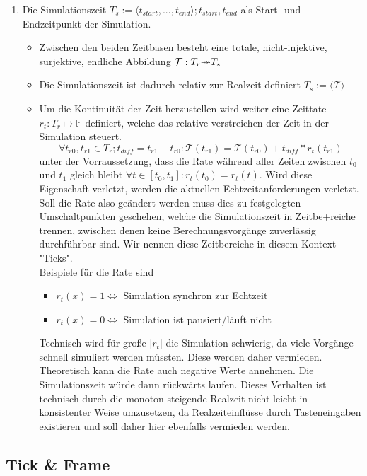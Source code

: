 \begin{enumerate}
\item Die Simulationszeit $T_s:=\langle t_{start}, ... , t_{end}\rangle; t_{start}, t_{end}$ als Start- und Endzeitpunkt der Simulation.
	\begin{itemize}
	\item Zwischen den beiden Zeitbasen besteht eine totale, nicht-injektive, surjektive, endliche Abbildung $\mathcal{T}:T_r \finite{\twoheadrightarrow} T_s$
	\item Die Simulationszeit ist dadurch relativ zur Realzeit definiert $T_s:=\langle\mathcal{T}\rangle$
	\item Um die Kontinuität der Zeit herzustellen wird weiter eine Zeittate $r_t:T_r\mapsto\mathbb{F}$ definiert, welche das relative verstreichen der Zeit in der Simulation steuert. 
	$$\forall t_{r0},  t_{r1} \in T_r ; t_{diff}=t_{r1}-t_{r0} :\mathcal{T}(t_{r1}) = \mathcal{T}(t_{r0}) + t_{diff}*r_t(t_{r1})$$ unter der Vorraussetzung, dass die Rate während aller Zeiten zwischen $t_0$ und $t_1$ gleich bleibt $\forall t \in [t_0,t_1]: r_t(t_0) = r_t(t)$. Wird diese Eigenschaft verletzt, werden die aktuellen Echtzeitanforderungen verletzt. \\
	Soll die Rate also geändert werden muss dies zu festgelegten Umschaltpunkten geschehen, welche die Simulationszeit in Zeitbe+reiche trennen, zwischen denen keine Berechnungsvorgänge zuverlässig durchführbar sind. Wir nennen diese Zeitbereiche in diesem Kontext "Ticks".\\
Beispiele für die Rate sind 
\begin{itemize}
\item $r_t(x) = 1 \Leftrightarrow$ Simulation synchron zur Echtzeit
\item $r_t(x) = 0 \Leftrightarrow$ Simulation ist pausiert/läuft nicht
\end{itemize}
Technisch wird für große $|r_t|$ die Simulation schwierig, da viele Vorgänge schnell simuliert werden müssten. Diese werden daher vermieden.\\
Theoretisch kann die Rate auch negative Werte annehmen. Die Simulationszeit würde dann rückwärts laufen. Dieses Verhalten ist technisch durch die monoton steigende Realzeit nicht leicht in konsistenter Weise umzusetzen, da Realzeiteinflüsse durch Tasteneingaben existieren und soll daher hier ebenfalls vermieden werden.
	\end{itemize}
\end{enumerate}	


\subsection{Tick \& Frame}


